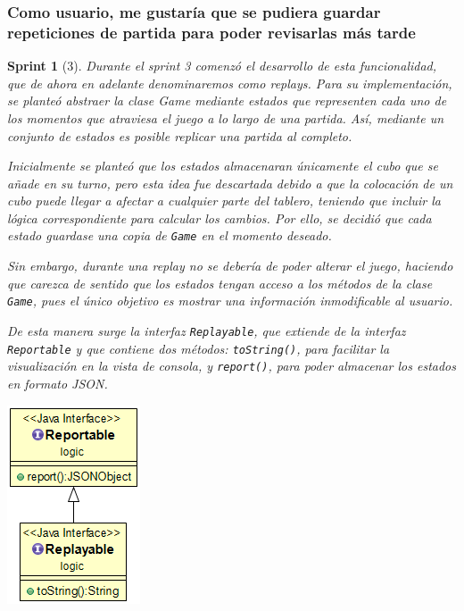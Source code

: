 \documentclass[12pt,a4paper,openright]{book}
\theoremstyle{break}
\newtheorem*{sprint}{Sprint}
\begin{document}
\subsubsection{Como usuario, me gustaría que se pudiera guardar repeticiones de partida para poder revisarlas más tarde}
\begin{sprint}[3]
Durante el sprint 3 comenzó el desarrollo de esta funcionalidad, que de ahora en adelante denominaremos como \textit{replays}. Para su implementación, se planteó abstraer la clase Game mediante estados que representen cada uno de los momentos que atraviesa el juego a lo largo de una partida. Así, mediante un conjunto de estados es posible replicar una partida al completo.

Inicialmente se planteó que los estados almacenaran únicamente el cubo que se añade en su turno, pero esta idea fue descartada debido a que la colocación de un cubo puede llegar a afectar a cualquier parte del tablero, teniendo que incluir la lógica correspondiente para calcular los cambios. Por ello, se decidió que cada estado guardase una copia de \texttt{Game} en el momento deseado.

Sin embargo, durante una \textit{replay} no se debería de poder alterar el juego, haciendo que carezca de sentido que los estados tengan acceso a  los métodos de la clase \texttt{Game}, pues el único objetivo es mostrar una información inmodificable al usuario.

De esta manera surge la interfaz \texttt{Replayable}, que extiende de la interfaz \texttt{Reportable} y que contiene dos métodos: \texttt{toString()}, para facilitar la visualización en la vista de consola, y \texttt{report()}, para poder almacenar los estados en formato JSON.

\begin{center}
\includegraphics[scale=0.5]{replayable-reportable-sprint-3.png}
\end{center}


\end{sprint}
\end{document}
